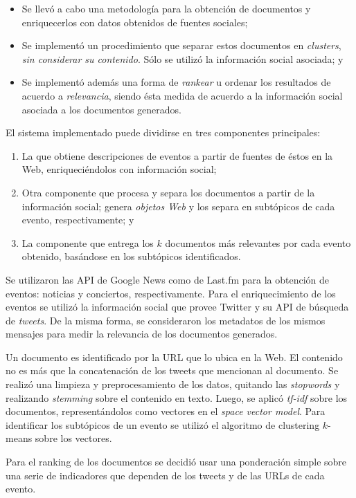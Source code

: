 \documentclass[upright, contnum]{umemoria}
\begin{document}
\begin{itemize}
\item Se llevó a cabo una metodología para la obtención de documentos y
     enriquecerlos con datos obtenidos de fuentes sociales;
\item Se implementó un procedimiento que separar estos documentos en
     \emph{clusters}, \emph{sin considerar su contenido}. Sólo se utilizó la
     información social asociada; y
\item Se implementó además una forma de \emph{rankear} u ordenar los
     resultados de acuerdo a \emph{relevancia}, siendo ésta medida de
     acuerdo a la información social asociada a los documentos
     generados.
\end{itemize}
   El sistema implementado puede dividirse en tres componentes
   principales:
\begin{enumerate}
\item La que obtiene descripciones de eventos a partir de fuentes de
      éstos en la Web, enriqueciéndolos con información social;
\item Otra componente que procesa y separa los documentos a partir de
      la información social; genera \emph{objetos Web} y los separa en
      subtópicos de cada evento, respectivamente; y
\item La componente que entrega los $k$ documentos más relevantes por
      cada evento obtenido, basándose en los subtópicos identificados.
\end{enumerate}
   Se utilizaron las API de Google News como de Last.fm para la
   obtención de eventos: noticias y conciertos, respectivamente. Para
   el enriquecimiento de los eventos se utilizó la información social
   que provee Twitter y su API de búsqueda de \emph{tweets}. De la misma
   forma, se consideraron los metadatos de los mismos mensajes para medir
   la relevancia de los documentos generados. 

   Un documento es identificado por la URL que lo ubica en la Web. El
   contenido no es más que la concatenación de los tweets que
   mencionan al documento. Se realizó una limpieza y preprocesamiento
   de los datos, quitando las \emph{stopwords} y realizando \emph{stemming}
   sobre el contenido en texto. Luego, se aplicó \emph{tf-idf} sobre los
   documentos, representándolos como vectores en el \emph{space vector    model}. Para identificar los subtópicos de un evento se utilizó el 
   algoritmo de clustering $k$-means sobre los vectores. 

   Para el ranking de los documentos se decidió usar una ponderación
   simple sobre una serie de indicadores que dependen de los tweets y
   de las URLs de cada evento.
\end{document}
